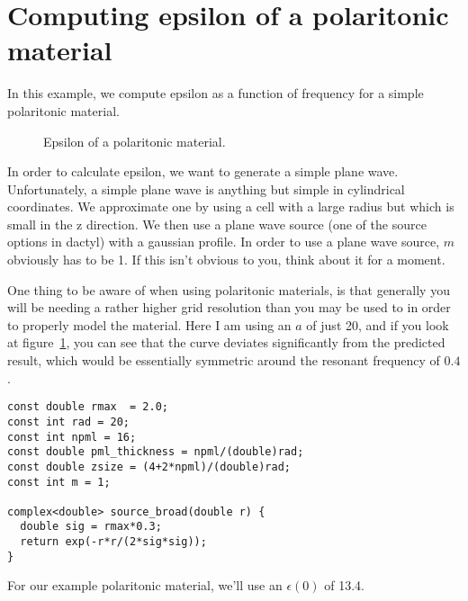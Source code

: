 \begin{comment}
#include <stdio.h>
#include <stdlib.h>
#include <signal.h>

#include "dactyl.h"
\end{comment}

\section{Computing epsilon of a polaritonic material}

In this example, we compute epsilon as a function of frequency for a simple
polaritonic material.

\begin{figure}
\label{epsilon_polariton}
\caption{Epsilon of a polaritonic material.}
\end{figure}

In order to calculate epsilon, we want to generate a simple plane wave.
Unfortunately, a simple plane wave is anything but simple in cylindrical
coordinates.  We approximate one by using a cell with a large radius but
which is small in the z direction.  We then use a plane wave source (one of
the source options in dactyl) with a gaussian profile.  In order to use a
plane wave source, $m$ obviously has to be 1.  If this isn't obvious to
you, think about it for a moment.

One thing to be aware of when using polaritonic materials, is that
generally you will be needing a rather higher grid resolution than you may
be used to in order to properly model the material.  Here I am using an $a$
of just 20, and if you look at figure~\ref{epsilon_polariton}, you can see
that the curve deviates significantly from the predicted result, which
would be essentially symmetric around the resonant frequency of $0.4$.

\begin{verbatim}
const double rmax  = 2.0;
const int rad = 20;
const int npml = 16;
const double pml_thickness = npml/(double)rad;
const double zsize = (4+2*npml)/(double)rad;
const int m = 1;

complex<double> source_broad(double r) {
  double sig = rmax*0.3;
  return exp(-r*r/(2*sig*sig));
}
\end{verbatim}

For our example polaritonic material, we'll use an $\epsilon(0)$ of 13.4.


